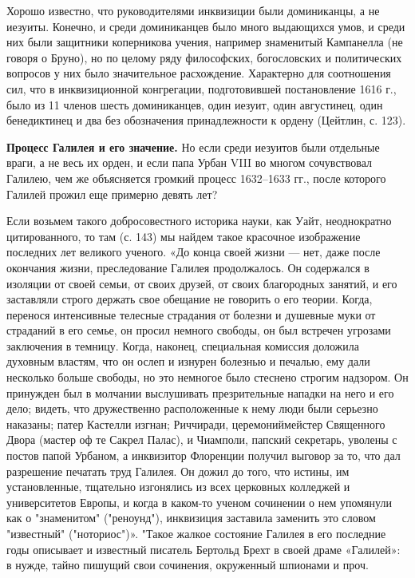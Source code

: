 Хорошо известно, что руководителями инквизиции были доминиканцы, а не иезуиты.
Конечно, и среди доминиканцев было много выдающихся умов, и среди них были
защитники коперникова учения, например знаменитый Кампанелла (не говоря о
Бруно), но по целому ряду философских, богословских и политических вопросов у
них было значительное расхождение. Характерно для соотношения сил, что в
инквизиционной конгрегации, подготовившей постановление 1616 г., было из 11
членов шесть доминиканцев, один иезуит, один августинец, один бенедиктинец и
два без обозначения принадлежности к ордену (Цейтлин, с. 123).

\textbf{Процесс Галилея и его значение.} Но если среди иезуитов были отдельные враги, а
не весь их орден, и если папа Урбан VIII во многом сочувствовал Галилею, чем же
объясняется громкий процесс 1632--1633 гг., после которого Галилей прожил еще
примерно девять лет?

Если возьмем такого добросовестного историка науки, как Уайт, неоднократно
цитированного, то там (с. 143) мы найдем такое красочное изображение последних
лет великого ученого. «До конца своей жизни --- нет, даже после окончания жизни,
преследование Галилея продолжалось. Он содержался в изоляции от своей семьи, от
своих друзей, от своих благородных занятий, и его заставляли строго держать
свое обещание не говорить о его теории. Когда, перенося интенсивные телесные
страдания от болезни и душевные муки от страданий в его семье, он просил
немного свободы, он был встречен угрозами заключения в темницу. Когда, наконец,
специальная комиссия доложила
духовным властям, что он ослеп и изнурен болезнью и печалью, ему дали несколько
больше свободы, но это немногое было стеснено строгим надзором. Он принужден
был в молчании выслушивать презрительные нападки на него и его дело; видеть,
что дружественно расположенные к нему люди были серьезно наказаны; патер
Кастелли изгнан; Риччиради, церемониймейстер Священного Двора (мастер оф те
Сакрел Палас), и Чиамполи, папский секретарь, уволены с постов папой Урбаном, а
инквизитор Флоренции получил выговор за то, что дал разрешение печатать труд
Галилея. Он дожил до того, что истины, им установленные, тщательно изгонялись
из всех церковных колледжей и университетов Европы, и когда в каком-то ученом
сочинении о нем упомянули как о "знаменитом" ("реноунд"), инквизиция заставила
заменить это словом "известный" ("ноториос")». "Такое жалкое состояние Галилея
в его последние годы описывает и известный писатель Бертольд Брехт в своей
драме «Галилей»: в нужде, тайно пишущий свои сочинения, окруженный шпионами и
проч.

